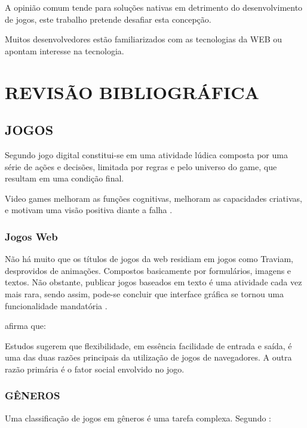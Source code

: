 \documentclass[
12pt,
a4paper,
portuges,
draft
]{report}
\renewenvironment{quote}
               {\list{}{\rightmargin\leftmargin}%
                \item\relax\fontsize{10}{12}}
               {\endlist}
\begin{document}
A opinião comum tende para soluções nativas em detrimento do
desenvolvimento de jogos, este trabalho pretende desafiar esta
concepção. %

Muitos desenvolvedores estão familiarizados
com as tecnologias da WEB ou apontam interesse na tecnologia.


\chapter{REVISÃO BIBLIOGRÁFICA}
\section{JOGOS}
Segundo \autocite{indieGamesLemes} jogo digital constitui-se em uma
atividade lúdica composta por uma série de ações e decisões,
limitada por regras e pelo universo do game, que resultam em uma
condição final.

Video games melhoram as funções cognitivas, melhoram as capacidades criativas, e
motivam uma visão positiva diante a falha \autocite{gamebenefits}.

\subsection{Jogos Web}

Não há muito que os títulos de jogos da web residiam em jogos como Traviam, desprovidos de animações. Compostos basicamente por formulários, imagens e textos. Não obstante, publicar jogos baseados em texto é uma atividade cada vez mais rara, sendo assim, pode-se concluir que interface gráfica se tornou uma funcionalidade mandatória \autocite{browserGamesTechnologyAndFuture}.


\cite{browserGamesTechnologyAndFuture} afirma que:
\begin{quote}
Estudos sugerem que flexibilidade, em essência facilidade de entrada e saída, é uma das duas razões principais da utilização de jogos de navegadores. A outra razão primária é o fator social envolvido no jogo.
\end{quote}


\subsection{GÊNEROS}

Uma classificação de jogos em gêneros é uma tarefa complexa. Segundo \autocite{gamebenefits}:
\end{document}
